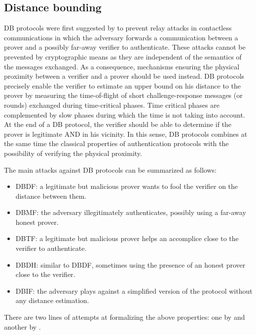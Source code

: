 \subsection{Distance bounding}%
\label{DistanceBounding}

\Ac{DB} protocols were first suggested by \citet{DistanceBounding} to prevent relay attacks in contactless communications in which the adversary forwards a communication between a prover and a possibly far-away verifier to authenticate. 
These attacks cannot be prevented by cryptographic means as they are independent of the semantics of the messages exchanged.
As a consequence, mechanisms ensuring the physical proximity between a verifier and a prover should be used instead.
\Ac{DB} protocols precisely enable the verifier to estimate an upper bound on his distance to the prover by measuring the time-of-flight of short challenge-response messages (or rounds) exchanged during time-critical phases. 
Time critical phases are complemented by slow phases during which the time is not taking into account. 
At the end of a \Ac{DB} protocol, the verifier should be able to determine if the prover is legitimate AND in his vicinity.
In this sense, \Ac{DB} protocols combines at the same time the classical properties of authentication protocols with the possibility of verifying the physical proximity.

The main attacks against \ac{DB} protocols can be summarized as follows:
\begin{itemize}
  \item \Acf{DBDF}: a legitimate but malicious prover wants to fool the verifier on the distance between them.
  \item \Acf{DBMF}: the adversary illegitimately authenticates, possibly using a far-away honest prover.
  \item \Acf{DBTF}: a legitimate but malicious prover helps an accomplice close to the verifier to authenticate.
  \item \Acf{DBDH}: similar to \ac{DBDF}, sometimes using the presence of an honest prover close to the verifier.
  \item \Acf{DBIF}: the adversary plays against a simplified version of the protocol without any distance estimation.
\end{itemize}
There are two lines of attempts at formalizing the above properties: one by \citet{DB-BMV} and another by \citet{DB-DFKO}.

